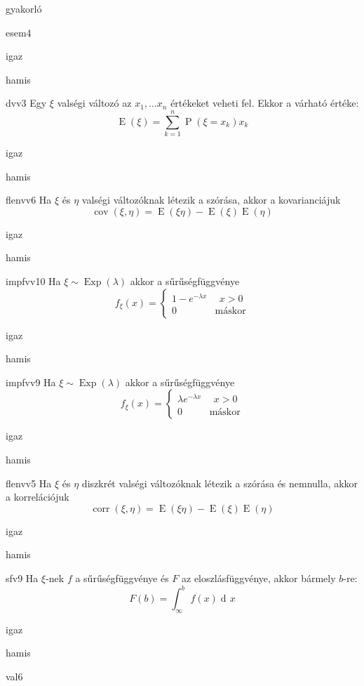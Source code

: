 \documentclass[12pt]{article}
\DeclareMathOperator{\Exp}{Exp}
\DeclareMathOperator{\E}{E}
\renewcommand{\P}{\operatorname{P}}
\DeclareMathOperator{\corr}{corr}
\renewcommand{\d}{\operatorname{d\! }} %
\DeclareMathOperator{\cov}{cov}
\begin{document}
\begin{quiz}{gyakorló}
\begin{multi}{esem4}
\item* igaz
\item hamis
\end{multi}
\begin{multi}{dvv3}
Egy $\xi$ valségi változó az $x_1,\ldots x_n$ értékeket veheti fel. Ekkor a várható értéke:
$$
\E(\xi)=\sum_{k=1}^n \P(\xi=x_k)x_k
$$
\item* igaz
\item hamis
\end{multi}
\begin{multi}{flenvv6}
Ha $\xi$ és $\eta$ valségi változóknak létezik a szórása, akkor a 
kovarianciájuk
$$
\cov(\xi,\eta)=\E(\xi\eta)-\E(\xi)\E(\eta)
$$
\item* igaz
\item hamis
\end{multi}
\begin{multi}{impfvv10}
Ha $\xi\sim \Exp(\lambda)$ akkor a sűrűségfüggvénye 
$$
f_{\xi}(x)=
\begin{cases}
1-e^{-\lambda x}& \ \ x>0\\
0 & \text{máskor} 
\end{cases}
$$
\item igaz
\item* hamis
\end{multi}
\begin{multi}{impfvv9}
Ha $\xi\sim \Exp(\lambda)$ akkor a sűrűségfüggvénye 
$$
f_{\xi}(x)=
\begin{cases}
\lambda e^{-\lambda x}& \ \ x>0\\
0 & \text{máskor} 
\end{cases}
$$
\item* igaz
\item hamis
\end{multi}
\begin{multi}{flenvv5}
Ha $\xi$ és $\eta$ diszkrét valségi változóknak létezik a szórása és nemnulla, akkor a 
korrelációjuk
$$
\corr(\xi,\eta)=\E(\xi\eta)-\E(\xi)\E(\eta)
$$
\item igaz
\item* hamis
\end{multi}
\begin{multi}{sfv9}
Ha $\xi$-nek $f$ a sűrűségfüggvénye és $F$ az eloszlásfüggvénye, akkor bármely $b$-re:
$$
F(b)=\int_{\infty}^{b}f(x)\d x
$$
\item* igaz
\item hamis
\end{multi}
\begin{multi}{val6}

\end{multi}
\end{quiz}
\end{document}
